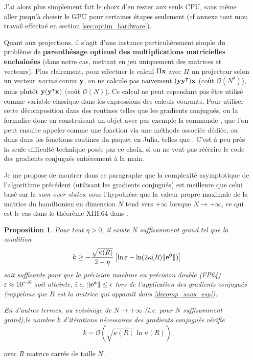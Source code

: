 \documentclass[svgnames,dvipsnames,a4paper,10pt,french]{report}
\newtheorem{proposition}[theorem]{Proposition}
\begin{document}
J'ai alors plus simplement fait le choix d'en rester aux seuls CPU, sans même aller jusqu'à choisir le GPU pour certaines étapes seulement (cf annexe tout mon travail effectué en section \ref{sec:optim_hardware}).


Quant aux projections, il s'agit d'une instance particulièrement simple du problème de \textbf{parenthésage optimal des multiplications matricielles enchaînées} (dans notre cas, mettant en jeu uniquement des matrices et vecteurs). Plus clairement, pour effectuer le calcul $\Pi \mathbf{x}$ avec $\Pi$ un projecteur selon un vecteur \emph{normé} connu $\mathbf{y}$, on ne calcule pas naïvement $(\mathbf{y} \mathbf{y}^\intercal) \mathbf{x}$ (coût $\mathcal{O}(N^2)$), mais plutôt $\mathbf{y} (\mathbf{y}^\intercal \mathbf{x})$ (coût $\mathcal{O}(N)$). Ce calcul ne peut cependant pas être utilisé comme variable classique dans les expressions des calculs courants. Pour utiliser cette décomposition dans des routines telles que les gradients conjugués, on la formalise donc en construisant un objet  avec par exemple la commande , que l'on peut ensuite appeler comme une fonction via une méthode associée dédiée, ou dans dans les fonctions routines du paquet  en Julia, telles que . C'est à peu près la seule \og difficulté technique \fg{} posée par ce choix, si on ne veut pas réécrire le code des gradients conjugués entièrement à la main.


Je me propose de montrer dans ce paragraphe que la complexité asymptotique de l'algorithme précédent (utilisant les gradients conjugués) est meilleure que celui basé sur la \emph{sum over states}, sous l'hypothèse que la valeur propre maximale de la matrice du hamiltonien en dimension $N$ tend vers $+\infty$ lorsque $N\rightarrow + \infty$, ce qui est le cas dans le théorème XIII.64 dans \cite{reed_methods_1980}. 


\begin{proposition}
Pour tout $\eta >0$, il existe $N$ suffisamment grand tel que la condition 
\begin{equation}
\label{condition_precision_machine}
    k   \ge - \frac{\sqrt{\kappa(R)}}{2-\eta} \left[\ln \varepsilon - \ln (2 \kappa (R) \| \mathbf{e}^0\|) \right]
\end{equation}
soit suffisante pour que la précision machine en précision double (FP64) $\varepsilon \approx 10^{-16}$ soit atteinte, i.e. $\|\mathbf{e}^k \| \le \epsilon$ lors de l'application des gradients conjugués (rappelons que $R$ est la matrice qui apparaît dans \ref{decomp_sous_esp}).


En d'autres termes, au voisinage de $N \rightarrow + \infty$ (i.e. pour $N$ suffisamment grand),le nombre $k$ d'itérations nécessaires des gradients conjugués vérifie
\begin{equation}
    \boxed{k = \mathcal{O}\left( \sqrt{\kappa(R)} \ln \kappa(R)\right)}
\end{equation}
\end{proposition}
avec $R$ matrice carrée de taille $N$.
\end{document}
